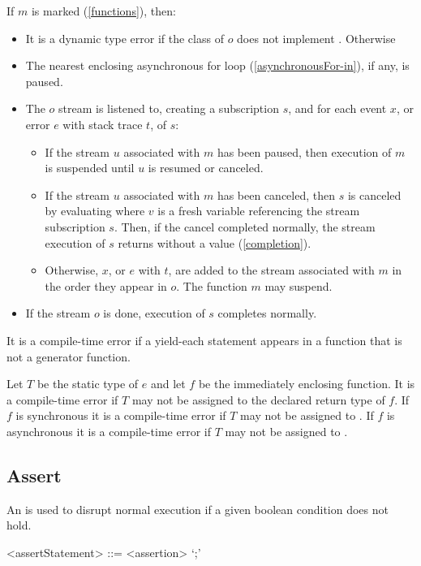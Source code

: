 \documentclass[makeidx]{article}
\begin{document}
{\LMHash{}%
If $m$ is marked \code{\ASYNC*} (\ref{functions}), then:
\begin{itemize}
\item It is a dynamic type error if the class of $o$ does not implement .
Otherwise
\item The nearest enclosing asynchronous for loop (\ref{asynchronousFor-in}), if any, is paused.
\item The $o$ stream is listened to, creating a subscription $s$, and for each event $x$, or error $e$ with stack trace $t$, of $s$:
\begin{itemize}
\item
If the stream $u$ associated with $m$ has been paused, then execution of $m$ is suspended until $u$ is resumed or canceled.
\item
If the stream $u$ associated with $m$ has been canceled,
then $s$ is canceled by evaluating  where $v$ is a fresh variable referencing the stream subscription $s$.
Then, if the cancel completed normally, the stream execution of $s$ returns without a value (\ref{completion}).
\item
Otherwise, $x$, or $e$ with $t$, are added to the stream associated with $m$ in the order they appear in $o$.
The function $m$ may suspend.
\end{itemize}
\item If the stream $o$ is done, execution of $s$ completes normally.
\end{itemize}

\LMHash{}%
It is a compile-time error if a yield-each statement appears in a function that is not a generator function.

\LMHash{}%
Let $T$ be the static type of $e$ and let $f$ be the immediately enclosing function.
It is a compile-time error if $T$ may not be assigned to the declared return type of $f$.
If $f$ is synchronous it is a compile-time error if $T$ may not be assigned to .
If $f$ is asynchronous it is a compile-time error if $T$ may not be assigned to .


\subsection{Assert}

\LMHash{}%
An  is used to disrupt normal execution if a given boolean condition does not hold.

\begin{grammar}
<assertStatement> ::= <assertion> `;'


\end{grammar}}
\end{document}
